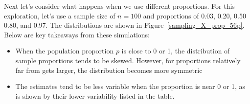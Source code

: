 
Next let's consider what happens when we use different proportions.
For this exploration, let's use a sample size of $n = 100$ and
proportions of 0.03, 0.20, 0.50 0.80, and 0.97. The distributions
are shown in Figure~\ref{sampling_X_prop_56p}. Below are key
takeaways from these simulations:
\begin{itemize}
\item When the population proportion $p$ is close to 0 or 1, the
    distribution of sample proportions tends to be skewed. However,
    for proportions relatively far from   gets larger, the
    distribution becomes more symmetric
\item The estimates tend to be less variable when the proportion
    is near 0 or 1, as is shown by their lower variability listed
    in the table.
\end{itemize}

